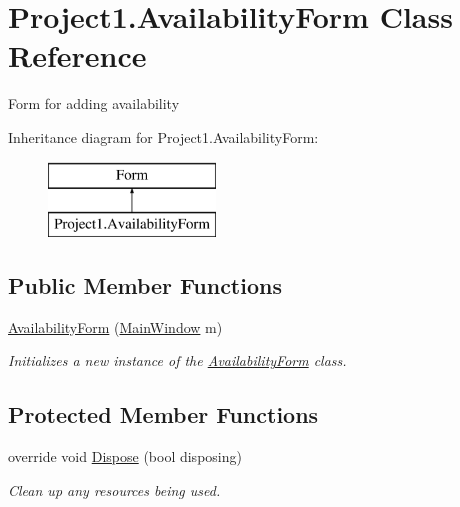 \hypertarget{class_project1_1_1_availability_form}{}\section{Project1.\+Availability\+Form Class Reference}
\label{class_project1_1_1_availability_form}


Form for adding availability  


Inheritance diagram for Project1.\+Availability\+Form\+:\begin{figure}[H]
\begin{center}
\leavevmode
\includegraphics[height=2.000000cm]{class_project1_1_1_availability_form}
\end{center}
\end{figure}
\subsection*{Public Member Functions}
\begin{DoxyCompactItemize}
\item 
\hyperlink{class_project1_1_1_availability_form_af98972a7bdd3aac1c90a011d12e20634}{Availability\+Form} (\hyperlink{class_project1_1_1_main_window}{Main\+Window} m)
\begin{DoxyCompactList}\small\item\em Initializes a new instance of the \hyperlink{class_project1_1_1_availability_form}{Availability\+Form} class. \end{DoxyCompactList}\end{DoxyCompactItemize}
\subsection*{Protected Member Functions}
\begin{DoxyCompactItemize}
\item 
override void \hyperlink{class_project1_1_1_availability_form_a8f5f4544312a07be4a5c18a0c5f7f57b}{Dispose} (bool disposing)
\begin{DoxyCompactList}\small\item\em Clean up any resources being used. \end{DoxyCompactList}\end{DoxyCompactItemize}


